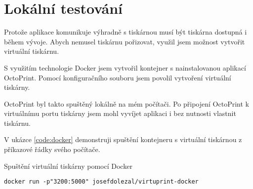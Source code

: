 \section{Lokální testování}

Protože aplikace komunikuje výhradně s tiskárnou musí být tiskárna dostupná i během vývoje.
Abych nemusel tiskárnu pořizovat, využil jsem možnost vytvořit virtuální tiskárnu.

S využitím technologie Docker jsem vytvořil kontejner s nainstalovanou aplikací OctoPrint.
Pomocí konfiguračního souboru jsem povolil vytvoření virtuální tiskárny.

OctoPrint byl takto spuštěný lokálně na mém počítači.
Po připojení OctoPrint k virtuálnímu portu tiskárny jsem mohl vyvíjet aplikaci i bez nutnosti vlastnit tiskárnu.

V ukázce \ref{code:docker} demonstruji spuštění kontejneru s virtuální tiskárnou z příkazové řádky svého počítače.

\begin{listing}[htbp]
\caption{\label{code:docker}Spuštění virtuální tiskárny pomocí Docker}
\begin{verbatim}
docker run -p"3200:5000" josefdolezal/virtuprint-docker 
\end{verbatim}
\end{listing}
